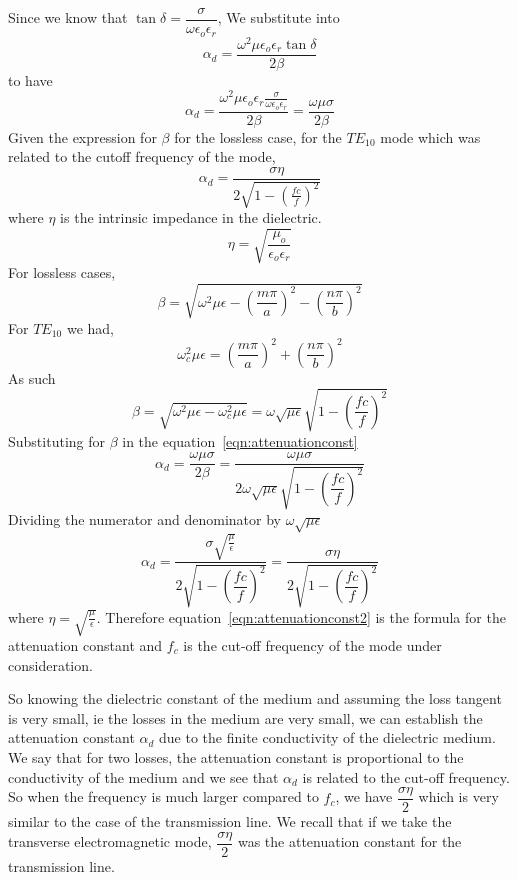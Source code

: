 Since we know that $\tan\delta = \dfrac{\sigma}{\omega\epsilon_{o}\epsilon_{r}}$, We substitute into 
$$\alpha_{d} = \dfrac{\omega^{2}\mu\epsilon_{o}\epsilon_{r}\tan\delta}{2\beta}$$ 
to have 
\begin{dmath}
\alpha_{d} = \dfrac{\omega^{2}\mu\epsilon_{o}\epsilon_{r}\frac{\sigma}{\omega\epsilon_{o}\epsilon_{r}}}{2\beta} = \dfrac{\omega\mu\sigma}{2\beta}
\label{eqn:attenuationconst}
\end{dmath}
Given the expression for $\beta$ for the lossless case, for the $TE_{10}$ mode which was related to the cutoff frequency of the mode, 
$$
\alpha_{d} =  \frac{\sigma\eta}{2\sqrt{1-(\frac{fc}{f})^{2}}}
$$
where $\eta$ is the intrinsic impedance in the dielectric.
$$	
\eta =  \sqrt{\frac{\mu_{o}}{\epsilon_{o}\epsilon_{r}}}
$$
For lossless cases, 
$$\beta = \sqrt{\omega^{2}\mu\epsilon-\left(\dfrac{m\pi}{a}\right)^{2}-\left(\dfrac{n\pi}{b}\right)^{2}}$$
For $TE_{10}$ we had, $$\omega^{2}_{c}\mu\epsilon = \left(\dfrac{m\pi}{a}\right)^{2}+\left(\dfrac{n\pi}{b}\right)^{2}$$	
As such 
\begin{dmath*}
\beta = \sqrt{\omega^{2}\mu\epsilon-\omega^{2}_{c}\mu\epsilon} = \omega\sqrt{\mu\epsilon}\sqrt{1-\left(\dfrac{fc}{f}\right)^{2}}
\end{dmath*}
Substituting for $\beta$ in the equation~\ref{eqn:attenuationconst}
\begin{dmath*}	
\alpha_{d}=\dfrac{\omega\mu\sigma}{2\beta}= \dfrac{\omega\mu\sigma}{2\omega\sqrt{\mu\epsilon}\sqrt{1-\left(\dfrac{fc}{f}\right)^{2}}}
\end{dmath*}
Dividing the numerator and denominator by $\omega\sqrt{\mu\epsilon}$
\begin{dmath}
\alpha_{d} = \dfrac{\sigma\sqrt{\frac{\mu}{\epsilon}}}{2\sqrt{1-\left(\dfrac{fc}{f}\right)^{2}}}=\dfrac{\sigma\eta}{2\sqrt{1 - \left(\dfrac{fc}{f}\right)^{2}}}
\label{eqn:attenuationconst2}
\end{dmath}
where $\eta= \sqrt{\frac{\mu}{\epsilon}}$. Therefore equation~\ref{eqn:attenuationconst2} is the formula for the attenuation constant and $f_c$ is the cut-off frequency of the mode under consideration.

So knowing the dielectric constant of the medium and assuming the loss tangent is very small, ie the losses in the medium are very small, we can establish the attenuation constant $\alpha_{d}$ due to the finite conductivity of the dielectric medium. We say that for two losses, the attenuation constant is proportional to the conductivity of the medium and we see that $\alpha_{d}$ is related to the cut-off frequency. So when the frequency is much larger compared to $f_{c}$, we have $\dfrac{\sigma\eta}{2}$ which is very similar to the case of the transmission line. We recall that if we take the transverse electromagnetic mode, $\dfrac{\sigma\eta}{2}$ was the attenuation constant for the transmission line.

